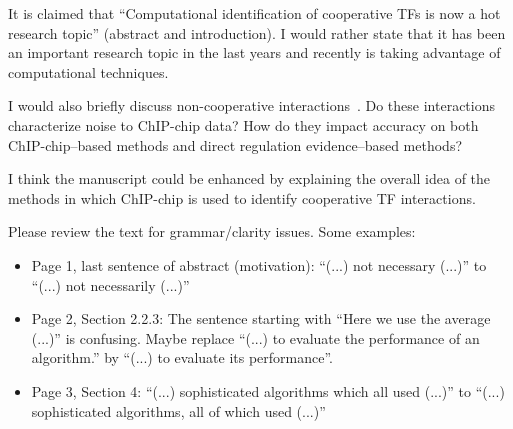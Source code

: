 \documentclass[11pt]{article}
\begin{document}
 It is claimed that ``Computational identification of cooperative TFs is now a hot research topic'' (abstract and introduction). I would rather state that it has been an important research topic in the last years and recently is taking advantage of computational techniques.

 I would also briefly discuss non-cooperative interactions~\cite{giorgetti2010,swami2010}. Do these interactions characterize noise to ChIP-chip data? How do they impact accuracy on both ChIP-chip--based methods and direct regulation evidence--based methods?

 I think the manuscript could be enhanced by explaining the overall idea of the methods in which ChIP-chip is used to identify cooperative TF interactions.

 Please review the text for grammar/clarity issues. Some examples:
\begin{itemize}
  \item Page 1, last sentence of abstract (motivation): ``(...) not necessary (...)'' to ``(...) not necessarily (...)''
  \item Page 2, Section 2.2.3: The sentence starting with ``Here we use the average (...)'' is confusing. Maybe replace ``(...) to evaluate the performance of an algorithm.'' by ``(...) to evaluate its performance''.
  \item Page 3, Section 4: ``(...) sophisticated algorithms which all used (...)'' to ``(...) sophisticated algorithms, all of which used (...)''
\end{itemize}



\end{document}
